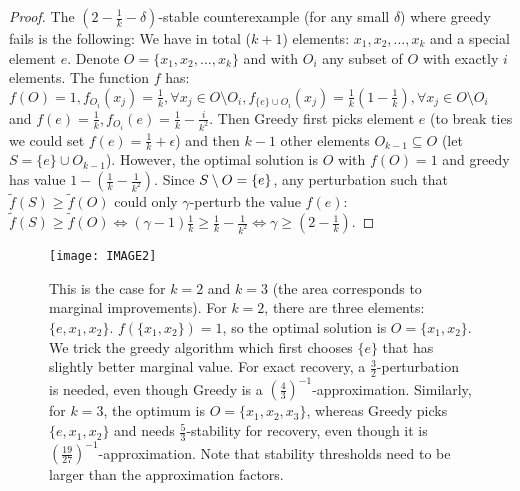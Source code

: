 \begin{proof}
The $(2-\tfrac{1}{k}-\delta)$-stable counterexample (for any small $\delta$) where greedy fails is the following: We have in total ($k+1$) elements: $x_1,x_2,\dots, x_k$ and a special element $e$. Denote $O=\{x_1,x_2,\dots, x_k\}$ and with $O_i$ any subset of $O$ with exactly $i$ elements. The function $f$ has: $f(O)=1, f_{O_i}(x_j)=\tfrac{1}{k}, \forall x_j\in O\setminus O_i,  f_{\{e\}\cup O_i}(x_j)=\tfrac{1}{k}(1-\tfrac{1}{k}), \forall x_j\in O\setminus O_i $ and $f(e)=\tfrac{1}{k}, f_{O_i}(e)=\tfrac{1}{k}-\tfrac{i}{k^2}$. Then Greedy first picks element $e$ (to break ties we could set $f(e)=\tfrac{1}{k}+\epsilon$) and then $k-1$ other elements $O_{k-1}\subseteq O$ (let $S=\{e\}\cup O_{k-1}$). However, the optimal solution is $O$ with $f(O)=1$ and greedy has value $1-(\tfrac{1}{k}-\tfrac{1}{k^2})$. Since $S\setminus O=\{e\}$, any perturbation such that $\tilde{f}(S)\ge \tilde{f}(O)$ could only $\gamma$-perturb the value $f(e)$: $\tilde{f}(S)\ge \tilde{f}(O)\iff (\gamma-1)\tfrac{1}{k}\ge\tfrac{1}{k}-\tfrac{1}{k^2} \iff \gamma\ge (2-\tfrac{1}{k})$.
\end{proof}
\begin{figure}[h!]
	\centering
	\texttt{[image: IMAGE2]}
        	\caption{This is the case for $k=2$ and $k=3$ (the area corresponds to marginal improvements). For $k=2$, there are three elements: $\{e,x_1,x_2\}$. $f(\{x_1,x_2\})=1$, so the optimal solution is $O=\{x_1,x_2\}$. We trick the greedy algorithm which first chooses $\{e\}$ that has slightly better marginal value. For exact recovery, a $\tfrac{3}{2}$-perturbation is needed, even though Greedy is a $\left(\tfrac{4}{3}\right)^{-1}$-approximation. Similarly, for $k=3$, the optimum is $O=\{x_1,x_2,x_3\}$, whereas Greedy picks $\{e,x_1,x_2\}$ and needs $\tfrac{5}{3}$-stability for recovery, even though it is $\left(\tfrac{19}{27}\right)^{-1}$-approximation. Note that stability thresholds need to be larger than the approximation factors.}
	\label{fig:cardinality}
\end{figure}




 
















